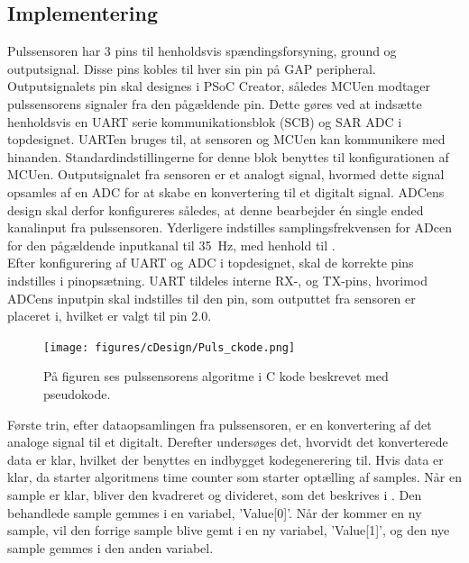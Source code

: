 \subsection{Implementering} \label{puls_impl}
Pulssensoren har 3 pins til henholdsvis spændingsforsyning, ground og outputsignal. Disse pins kobles til hver sin pin på GAP peripheral. Outputsignalets pin skal designes i PSoC Creator, således MCUen modtager pulssensorens signaler fra den pågældende pin. Dette gøres ved at indsætte henholdsvis en UART serie kommunikationsblok (SCB) og SAR ADC i topdesignet. UARTen bruges til, at sensoren og MCUen kan kommunikere med hinanden. Standardindstillingerne for denne blok benyttes til konfigurationen af MCUen. \newline
Outputsignalet fra sensoren er et analogt signal, hvormed dette signal opsamles af en ADC for at skabe en konvertering til et digitalt signal. ADCens design skal derfor konfigureres således, at denne bearbejder én single ended kanalinput fra pulssensoren. Yderligere indstilles samplingsfrekvensen for ADcen for den pågældende inputkanal til 35~Hz, med henhold til . \\
Efter konfigurering af UART og ADC i topdesignet, skal de korrekte pins indstilles i pinopsætning. UART tildeles interne RX-, og TX-pins, hvorimod ADCens inputpin skal indstilles til den pin, som outputtet fra sensoren er placeret i, hvilket er valgt til pin 2.0. 
\begin{figure}[H]
	\centering
	\texttt{[image: figures/cDesign/Puls\_ckode.png]}
	\caption{På figuren ses pulssensorens algoritme i C kode beskrevet med pseudokode.}
	\label{fig:puls_pseudo_c}
\end{figure} \vspace{-0.5cm}
Første trin, efter dataopsamlingen fra pulssensoren, er en konvertering af det analoge signal til et digitalt. Derefter undersøges det, hvorvidt det konverterede data er klar, hvilket der benyttes en indbygget kodegenerering til. Hvis data er klar, da starter algoritmens time counter som starter optælling af samples. Når en sample er klar, bliver den kvadreret og divideret, som det beskrives i . Den behandlede sample gemmes i en variabel, 'Value[0]'. Når der kommer en ny sample, vil den forrige sample blive gemt i en ny variabel, 'Value[1]', og den nye sample gemmes i den anden variabel. \\
